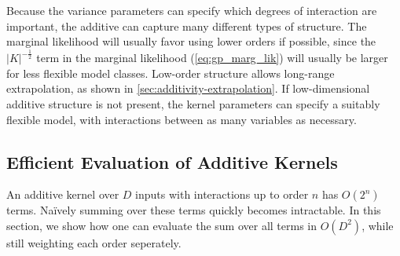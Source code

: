 
Because the variance parameters can specify which degrees of interaction are important, the additive \gp{} can capture many different types of structure.
The marginal likelihood will usually favor using lower orders if possible, since the $|K|^{-\frac{1}{2}}$ term in the \gp{} marginal likelihood (\cref{eq:gp_marg_lik}) will usually be larger for less flexible model classes.
Low-order structure allows long-range extrapolation, as shown in \cref{sec:additivity-extrapolation}.
If low-dimensional additive structure is not present, the kernel parameters can specify a suitably flexible model, with interactions between as many variables as necessary.





\subsection{Efficient Evaluation of Additive Kernels}
An additive kernel over $D$ inputs with interactions up to order $n$ has $O(2^n)$ terms.
Na\"{i}vely summing over these terms quickly becomes intractable.
In this section, we show how one can evaluate the sum over all terms in $O(D^2)$, while still weighting each order seperately.

